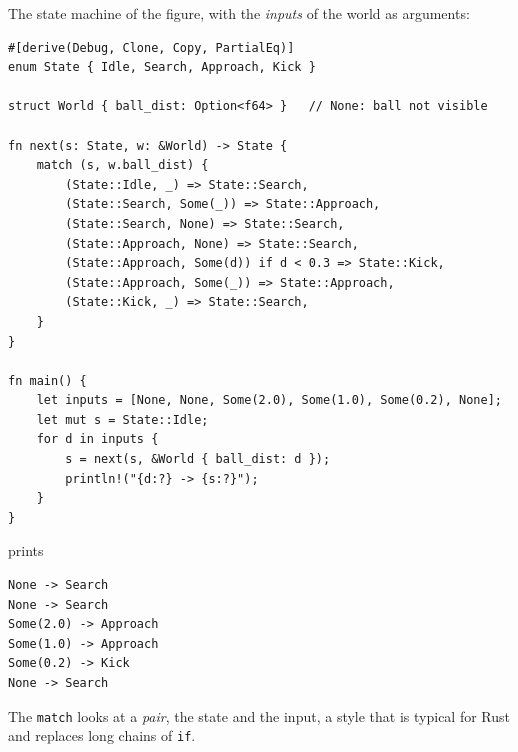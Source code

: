 \begin{center}
\end{center}
The state machine of the figure, with the \emph{inputs} of the world as arguments:
\begin{verbatim}
#[derive(Debug, Clone, Copy, PartialEq)]
enum State { Idle, Search, Approach, Kick }

struct World { ball_dist: Option<f64> }   // None: ball not visible

fn next(s: State, w: &World) -> State {
    match (s, w.ball_dist) {
        (State::Idle, _) => State::Search,
        (State::Search, Some(_)) => State::Approach,
        (State::Search, None) => State::Search,
        (State::Approach, None) => State::Search,
        (State::Approach, Some(d)) if d < 0.3 => State::Kick,
        (State::Approach, Some(_)) => State::Approach,
        (State::Kick, _) => State::Search,
    }
}

fn main() {
    let inputs = [None, None, Some(2.0), Some(1.0), Some(0.2), None];
    let mut s = State::Idle;
    for d in inputs {
        s = next(s, &World { ball_dist: d });
        println!("{d:?} -> {s:?}");
    }
}
\end{verbatim}
prints
\begin{verbatim}
None -> Search
None -> Search
Some(2.0) -> Approach
Some(1.0) -> Approach
Some(0.2) -> Kick
None -> Search
\end{verbatim}
The \verb!match! looks at a \emph{pair}, the state and the input, a style that is typical for Rust and replaces long chains of \verb!if!.

